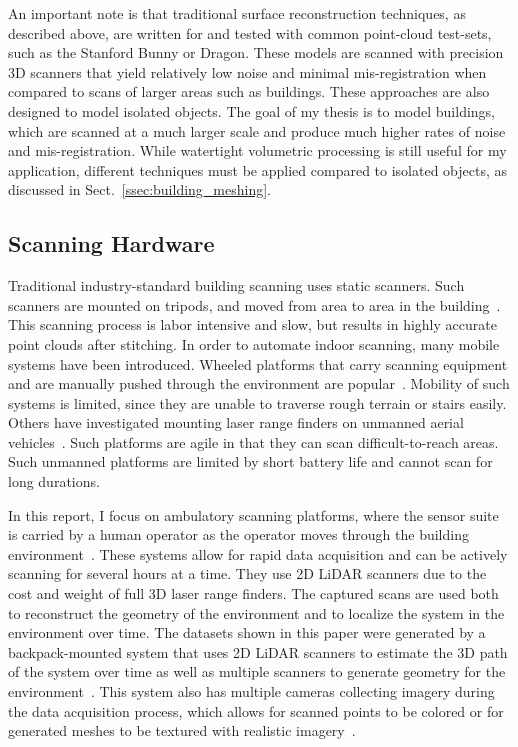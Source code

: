 \documentclass[journal]{IEEEtran}
\begin{document}
An important note is that traditional surface reconstruction techniques, as described above, are written for and tested with common point-cloud test-sets, such as the Stanford Bunny or Dragon.  These models are scanned with precision 3D scanners that yield relatively low noise and minimal mis-registration when compared to scans of larger areas such as buildings.  These approaches are also designed to model isolated objects.  The goal of my thesis is to model buildings, which are scanned at a much larger scale and produce much higher rates of noise and mis-registration.  While watertight volumetric processing is still useful for my application, different techniques must be applied compared to isolated objects, as discussed in Sect.~\ref{ssec:building_meshing}.

\subsection{Scanning Hardware}
\label{ssec:hardware}

Traditional industry-standard building scanning uses static scanners.  Such scanners are mounted on tripods, and moved from area to area in the building~\cite{RoomSegmentation,HistWallRecon,BasicPlaneFit}. This scanning process is labor intensive and slow, but results in highly accurate point clouds after stitching.  In order to automate indoor scanning, many mobile systems have been introduced.  Wheeled platforms that carry scanning equipment and are manually pushed through the environment are popular~\cite{Carving, ProbabilisticRobotics}.  Mobility of such systems is limited, since they are unable to traverse rough terrain or stairs easily.  Others have investigated mounting laser range finders on unmanned aerial vehicles~\cite{Quadrotor,QuadrotorMIT}.  Such platforms are agile in that they can scan difficult-to-reach areas.  Such unmanned platforms are limited by short battery life and cannot scan for long durations.

In this report, I focus on ambulatory scanning platforms, where the sensor suite is carried by a human operator as the operator moves through the building environment~\cite{Sweep,MITBackpack,VillageHeritage}.  These systems allow for rapid data acquisition and can be actively scanning for several hours at a time.  They use 2D LiDAR scanners due to the cost and weight of full 3D laser range finders.  The captured scans are used both to reconstruct the geometry of the environment and to localize the system in the environment over time.  The datasets shown in this paper were generated by a backpack-mounted system that uses 2D LiDAR scanners to estimate the 3D path of the system over time as well as multiple scanners to generate geometry for the environment~\cite{liu2010indoor,Backpack,Localization,NickJournal}.  This system also has multiple cameras collecting imagery during the data acquisition process, which allows for scanned points to be colored or for generated meshes to be textured with realistic imagery~\cite{Cheng14}. 
\end{document}
